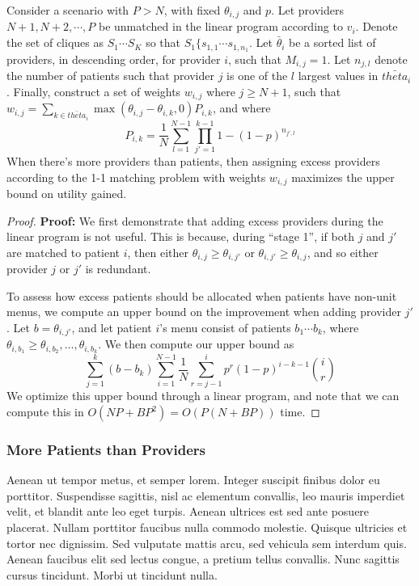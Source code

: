 \begin{lemma}
    Consider a scenario with $P>N$, with fixed $\theta_{i,j}$ and $p$. 
    Let providers $N+1,N+2,\cdots,P$ be unmatched in the linear program according to $v_{i}$. 
    Denote the set of cliques as $S_{1} \cdots S_{K}$ so that $S_{1} \{s_{1,1} \cdots s_{1,n_{1}}$. 
    Let $\bar{\theta}_{i}$ be a sorted list of providers, in descending order, for provider $i$, such that $M_{i,j} = 1$. 
    Let $n_{j,l}$ denote the number of patients such that provider $j$ is one of the $l$ largest values in $\bar{theta}_{i}$. 
    Finally, construct a set of weights $w_{i,j}$ where $j \geq N+1$, such that $w_{i,j} = \sum_{k \in \bar{theta}_{i}} \max(\theta_{i,j}-\theta_{i,k},0) P_{i,k}$, and where 
    \begin{equation}
        P_{i,k} = \frac{1}{N} \sum_{l=1}^{N-1} \prod_{j'=1}^{k-1} 1-(1-p)^{n_{j',l}}
    \end{equation}
    When there's more providers than patients, then assigning excess providers according to the 1-1 matching problem with weights $w_{i,j}$ maximizes the upper bound on utility gained. 
\end{lemma}
\begin{proof}
    \textbf{Proof:} We first demonstrate that adding excess providers during the linear program is not useful. 
    This is because, during ``stage 1'', if both $j$ and $j'$ are matched to patient $i$, then either $\theta_{i,j} \geq \theta_{i,j'}$ or $\theta_{i,j'} \geq \theta_{i,j}$, and so either provider $j$ or $j'$ is redundant. 

    To assess how excess patients should be allocated when patients have non-unit menus, we compute an upper bound on the improvement when adding provider $j'$. 
    Let $b=\theta_{i,j'}$, and let patient $i$'s menu consist of patients $b_{1} \cdots b_{k}$, where $\theta_{i,b_{1}} \geq \theta_{i,b_{2}}, \ldots, \theta_{i,b_{k}}$. 
    We then compute our upper bound as 
    \begin{equation}
        \sum_{j=1}^{k} (b-b_{k}) \sum_{i=1}^{N-1} \frac{1}{N} \sum_{r=j-1}^{i} p^{r} (1-p)^{i-k-1} {i \choose r}
    \end{equation}
    We optimize this upper bound through a linear program, and note that we can compute this in $O(NP + BP^{2}) = O(P(N+BP))$ time. 
\end{proof}

\subsubsection{More Patients than Providers}
 Aenean ut tempor metus, et semper lorem. Integer suscipit finibus dolor eu porttitor. Suspendisse sagittis, nisl ac elementum convallis, leo mauris imperdiet velit, et blandit ante leo eget turpis. Aenean ultrices est sed ante posuere placerat. Nullam porttitor faucibus nulla commodo molestie. Quisque ultricies et tortor nec dignissim. Sed vulputate mattis arcu, sed vehicula sem interdum quis. Aenean faucibus elit sed lectus congue, a pretium tellus convallis. Nunc sagittis cursus tincidunt. Morbi ut tincidunt nulla.

